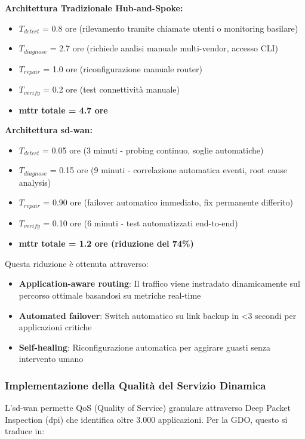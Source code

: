 \textbf{Architettura Tradizionale Hub-and-Spoke:}
\begin{itemize}
    \item $T_{detect}$ = 0.8 ore (rilevamento tramite chiamate utenti o monitoring basilare)
    \item $T_{diagnose}$ = 2.7 ore (richiede analisi manuale multi-vendor, accesso CLI)
    \item $T_{repair}$ = 1.0 ore (riconfigurazione manuale router)
    \item $T_{verify}$ = 0.2 ore (test connettività manuale)
    \item \textbf{\gls{mttr} totale = 4.7 ore}
\end{itemize}

\textbf{Architettura \gls{sd-wan}:}
\begin{itemize}
    \item $T_{detect}$ = 0.05 ore (3 minuti - probing continuo, soglie automatiche)
    \item $T_{diagnose}$ = 0.15 ore (9 minuti - correlazione automatica eventi, root cause analysis)
    \item $T_{repair}$ = 0.90 ore (failover automatico immediato, fix permanente differito)
    \item $T_{verify}$ = 0.10 ore (6 minuti - test automatizzati end-to-end)
    \item \textbf{\gls{mttr} totale = 1.2 ore (riduzione del 74\%)}
\end{itemize}

Questa riduzione è ottenuta attraverso:
\begin{itemize}
    \item \textbf{Application-aware routing}: Il traffico viene instradato dinamicamente sul percorso ottimale basandosi su metriche real-time
    \item \textbf{Automated failover}: Switch automatico su link backup in <3 secondi per applicazioni critiche
    \item \textbf{Self-healing}: Riconfigurazione automatica per aggirare guasti senza intervento umano
\end{itemize}

\subsubsection{\texorpdfstring{\textbf{Implementazione della Qualità del Servizio Dinamica}}{3.3.1.3 - Implementazione della Qualità del Servizio Dinamica}}

L'\gls{sd-wan} permette QoS (Quality of Service) granulare attraverso Deep Packet Inspection (\gls{dpi}) che identifica oltre 3.000 applicazioni. Per la GDO, questo si traduce in:

